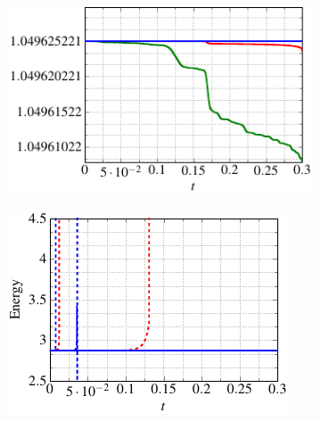 \begin{figure}
\begin{subfigure}[]{0.48\linewidth}
  \end{subfigure}\hfill%
  \begin{subfigure}[]{0.48\linewidth}
          \includegraphics[scale=1]{Figures/paper-figure11.pdf}
  \end{subfigure}
  \begin{subfigure}[]{0.48\linewidth}
          \includegraphics[scale=1]{Figures/paper-figure12.pdf}

\end{subfigure}
\end{figure}
